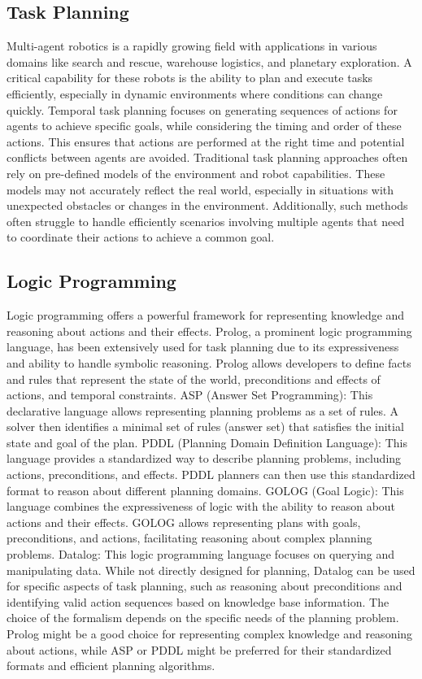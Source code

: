 \subsection{Task Planning}
Multi-agent robotics is a rapidly growing field with applications in various domains like search and rescue, warehouse logistics, and planetary exploration. A critical capability for these robots is the ability to plan and execute tasks efficiently, especially in dynamic environments where conditions can change quickly. Temporal task planning focuses on generating sequences of actions for agents to achieve specific goals, while considering the timing and order of these actions. This ensures that actions are performed at the right time and potential conflicts between agents are avoided.  
Traditional task planning approaches often rely on pre-defined models of the environment and robot capabilities. These models may not accurately reflect the real world, especially in situations with unexpected obstacles or changes in the environment. Additionally, such methods often struggle to handle efficiently scenarios involving multiple agents that need to coordinate their actions to achieve a common goal.

\subsection{Logic Programming}
Logic programming offers a powerful framework for representing knowledge and reasoning about actions and their effects. Prolog, a prominent logic programming language, has been extensively used for task planning due to its expressiveness and ability to handle symbolic reasoning. Prolog allows developers to define facts and rules that represent the state of the world, preconditions and effects of actions, and temporal constraints. %
ASP (Answer Set Programming): This declarative language allows representing planning problems as a set of rules. A solver then identifies a minimal set of rules (answer set) that satisfies the initial state and goal of the plan.
PDDL (Planning Domain Definition Language): This language provides a standardized way to describe planning problems, including actions, preconditions, and effects. PDDL planners can then use this standardized format to reason about different planning domains.
GOLOG (Goal Logic): This language combines the expressiveness of logic with the ability to reason about actions and their effects. GOLOG allows representing plans with goals, preconditions, and actions, facilitating reasoning about complex planning problems.
Datalog: This logic programming language focuses on querying and manipulating data. While not directly designed for planning, Datalog can be used for specific aspects of task planning, such as reasoning about preconditions and identifying valid action sequences based on knowledge base information.
The choice of the formalism depends on the specific needs of the planning problem. Prolog might be a good choice for representing complex knowledge and reasoning about actions, while ASP or PDDL might be preferred for their standardized formats and efficient planning algorithms.

